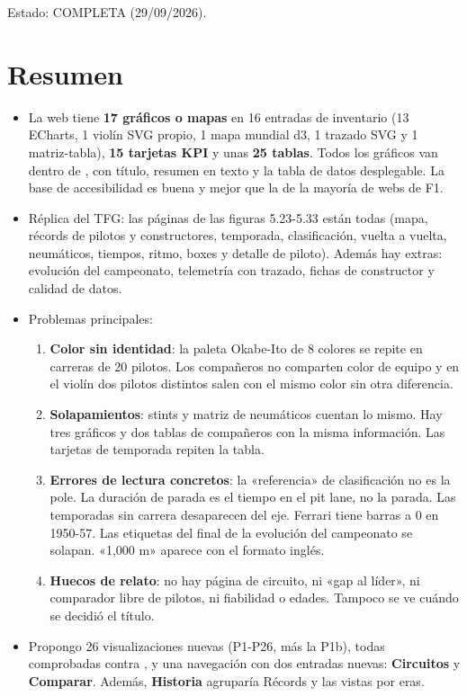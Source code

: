 \begin{nota}
Estado: COMPLETA (29/09/2026).
\end{nota}

\section{Resumen}

\begin{itemize}
\item La web tiene \textbf{17 gráficos o mapas} en 16 entradas de inventario (13 ECharts, 1 violín SVG propio, 1 mapa mundial d3, 1 trazado SVG y 1 matriz-tabla), \textbf{15 tarjetas KPI} y unas \textbf{25 tablas}. Todos los gráficos van dentro de , con título, resumen en texto y la tabla de datos desplegable. La base de accesibilidad es buena y mejor que la de la mayoría de webs de F1.
\item Réplica del TFG: las páginas de las figuras 5.23-5.33 están todas (mapa, récords de pilotos y constructores, temporada, clasificación, vuelta a vuelta, neumáticos, tiempos, ritmo, boxes y detalle de piloto). Además hay extras: evolución del campeonato, telemetría con trazado, fichas de constructor y calidad de datos.
\item Problemas principales:
\begin{enumerate}
\item \textbf{Color sin identidad}: la paleta Okabe-Ito de 8 colores se repite en carreras de 20 pilotos. Los compañeros no comparten color de equipo y en el violín dos pilotos distintos salen con el mismo color sin otra diferencia.
\item \textbf{Solapamientos}: stints y matriz de neumáticos cuentan lo mismo. Hay tres gráficos y dos tablas de compañeros con la misma información. Las tarjetas de temporada repiten la tabla.
\item \textbf{Errores de lectura concretos}: la «referencia» de clasificación no es la pole. La duración de parada es el tiempo en el pit lane, no la parada. Las temporadas sin carrera desaparecen del eje. Ferrari tiene barras a 0 en 1950-57. Las etiquetas del final de la evolución del campeonato se solapan. «1,000 m» aparece con el formato inglés.
\item \textbf{Huecos de relato}: no hay página de circuito, ni «gap al líder», ni comparador libre de pilotos, ni fiabilidad o edades. Tampoco se ve cuándo se decidió el título.
\end{enumerate}
\item Propongo 26 visualizaciones nuevas (P1-P26, más la P1b), todas comprobadas contra , y una navegación con dos entradas nuevas: \textbf{Circuitos} y \textbf{Comparar}. Además, \textbf{Historia} agruparía Récords y las vistas por eras.
\end{itemize}

